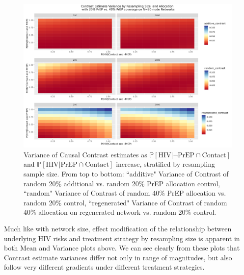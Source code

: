 \documentclass{article}
\theoremstyle{definition}
\begin{document}
\begin{figure}[H]
    \centering
    \includegraphics[width=\linewidth]{Corrected Figures/Resampling Size Variance Plot.png}
    \caption{Variance of Causal Contrast estimates as $\mathbb{P}\left[\text{HIV} \vert \neg \text{PrEP} \cap \text{Contact}\right]$ and $\mathbb{P}\left[\text{HIV} \vert \text{PrEP} \cap \text{Contact}\right]$ increase, stratified by resampling sample size. From top to bottom: ``additive" Variance of Contrast of random 20\% additional vs. random 20\% PrEP allocation control, ``random" Variance of Contrast of random 40\% PrEP allocation vs. random 20\% control, ``regenerated" Variance of Contrast of random 40\% allocation on regenerated network vs. random 20\% control.}
    \label{ffig:Figure S4.4}
\end{figure}
Much like with network size, effect modification of the relationship between underlying HIV risks and treatment strategy by resampling size is apparent in both Mean and Variance plots above. We can see clearly from these plots that Contrast estimate variances differ not only in range of magnitudes, but also follow very different gradients under different treatment strategies.
\end{document}
